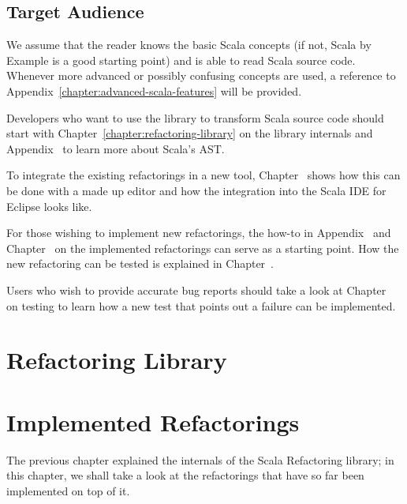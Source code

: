 \documentclass[10pt,a4paper,oneside]{scrreprt}
\begin{document}
\section{Target Audience}

We assume that the reader knows the basic Scala concepts (if not, Scala by Example \cite{ScalaByExample} is a good starting point) and is able to read Scala source code. Whenever more advanced or possibly confusing concepts are used, a reference to Appendix~\ref{chapter:advanced-scala-features} will be provided.

Developers who want to use the library to transform Scala source code should start with Chapter~\vref{chapter:refactoring-library} on the library internals and Appendix~ to learn more about Scala's AST. 

To integrate the existing refactorings in a new tool, Chapter~ shows how this can be done with a made up editor and how the integration into the Scala IDE for Eclipse looks like.

For those wishing to implement new refactorings, the how-to in Appendix~ and Chapter~ on the implemented refactorings can serve as a starting point. How the new refactoring can be tested is explained in Chapter~.

Users who wish to provide accurate bug reports should take a look at Chapter~ on testing to learn how a new test that points out a failure can be implemented.

\chapter{Refactoring Library} \label{chapter:refactoring-library}

 \label{end-chapter:refactoring-library}

\chapter{Implemented Refactorings} \label{chapter:implemented-refactorings}

The previous chapter explained the internals of the Scala Refactoring library; in this chapter, we shall take a look at the refactorings that have so far been implemented on top of it. 
\end{document}
